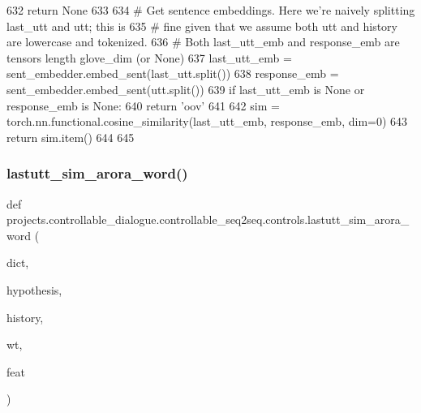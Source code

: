 \begin{DoxyCode}
632         \textcolor{keywordflow}{return} \textcolor{keywordtype}{None}
633 
634     \textcolor{comment}{# Get sentence embeddings. Here we're naively splitting last\_utt and utt; this is}
635     \textcolor{comment}{# fine given that we assume both utt and history are lowercase and tokenized.}
636     \textcolor{comment}{# Both last\_utt\_emb and response\_emb are tensors length glove\_dim (or None)}
637     last\_utt\_emb = sent\_embedder.embed\_sent(last\_utt.split())
638     response\_emb = sent\_embedder.embed\_sent(utt.split())
639     \textcolor{keywordflow}{if} last\_utt\_emb \textcolor{keywordflow}{is} \textcolor{keywordtype}{None} \textcolor{keywordflow}{or} response\_emb \textcolor{keywordflow}{is} \textcolor{keywordtype}{None}:
640         \textcolor{keywordflow}{return} \textcolor{stringliteral}{'oov'}
641 
642     sim = torch.nn.functional.cosine\_similarity(last\_utt\_emb, response\_emb, dim=0)
643     \textcolor{keywordflow}{return} sim.item()
644 
645 
\end{DoxyCode}
\mbox{\label{namespaceprojects_1_1controllable__dialogue_1_1controllable__seq2seq_1_1controls_afe0a10c32acfb1a7dd586ac644412589}} 
\subsubsection{\texorpdfstring{lastutt\+\_\+sim\+\_\+arora\+\_\+word()}{lastutt\_sim\_arora\_word()}}
{\footnotesize\ttfamily def projects.\+controllable\+\_\+dialogue.\+controllable\+\_\+seq2seq.\+controls.\+lastutt\+\_\+sim\+\_\+arora\+\_\+word (\begin{DoxyParamCaption}\item[{}]{dict,  }\item[{}]{hypothesis,  }\item[{}]{history,  }\item[{}]{wt,  }\item[{}]{feat }\end{DoxyParamCaption})}

